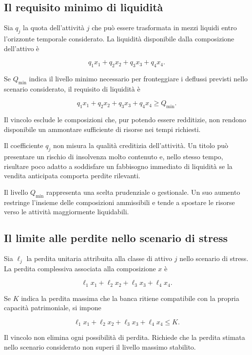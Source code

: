 \subsection{Il requisito minimo di liquidit\`a}

Sia $q_j$ la quota dell'attivit\`a $j$ che pu\`o essere trasformata in mezzi
liquidi entro l'orizzonte temporale considerato. La liquidit\`a disponibile
dalla composizione dell'attivo \`e

\[
q_1x_1+q_2x_2+q_3x_3+q_4x_4.
\]

Se $Q_{\min}$ indica il livello minimo necessario per fronteggiare i deflussi
previsti nello scenario considerato, il requisito di liquidit\`a \`e

\[
q_1x_1+q_2x_2+q_3x_3+q_4x_4
\geq
Q_{\min}.
\]

Il vincolo esclude le composizioni che, pur potendo essere redditizie, non
rendono disponibile un ammontare sufficiente di risorse nei tempi richiesti.

Il coefficiente $q_j$ non misura la qualit\`a creditizia dell'attivit\`a. Un
titolo pu\`o presentare un rischio di insolvenza molto contenuto e, nello
stesso tempo, risultare poco adatto a soddisfare un fabbisogno immediato di
liquidit\`a se la vendita anticipata comporta perdite rilevanti.

Il livello $Q_{\min}$ rappresenta una scelta prudenziale o gestionale. Un suo
aumento restringe l'insieme delle composizioni ammissibili e tende a spostare
le risorse verso le attivit\`a maggiormente liquidabili.

\subsection{Il limite alle perdite nello scenario di stress}

Sia $\ell_j$ la perdita unitaria attribuita alla classe di attivo $j$ nello
scenario di stress. La perdita complessiva associata alla composizione $x$ \`e

\[
\ell_1x_1+\ell_2x_2+\ell_3x_3+\ell_4x_4.
\]

Se $K$ indica la perdita massima che la banca ritiene compatibile con la
propria capacit\`a patrimoniale, si impone

\[
\ell_1x_1+\ell_2x_2+\ell_3x_3+\ell_4x_4
\leq
K.
\]

Il vincolo non elimina ogni possibilit\`a di perdita. Richiede che la perdita
stimata nello scenario considerato non superi il livello massimo stabilito.

